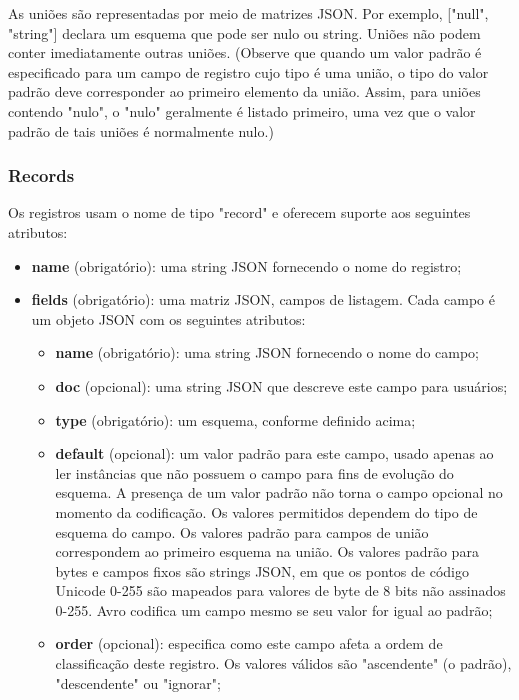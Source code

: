 \documentclass[12pt]{article}
\begin{document}
As uniões são representadas por meio de matrizes JSON. Por exemplo, ["null", "string"] declara um esquema que pode ser nulo ou string. Uniões não podem conter imediatamente outras uniões. (Observe que quando um valor padrão é especificado para um campo de registro cujo tipo é uma união, o tipo do valor padrão deve corresponder ao primeiro elemento da união. Assim, para uniões contendo "nulo", o "nulo" geralmente é listado primeiro, uma vez que o valor padrão de tais uniões é normalmente nulo.)

\subsubsection{Records}
Os registros usam o nome de tipo "record" e oferecem suporte aos seguintes atributos: 

\begin{itemize}
    \item \textbf{name} (obrigatório): uma string JSON fornecendo o nome do registro;
    
    \item \textbf{fields} (obrigatório): uma matriz JSON, campos de listagem. Cada campo é um objeto JSON com os seguintes atributos: 
    \begin{itemize}
        \item \textbf{name} (obrigatório): uma string JSON fornecendo o nome do campo;
        
        \item \textbf{doc} (opcional): uma string JSON que descreve este campo para usuários;
        
        \item \textbf{type} (obrigatório): um esquema, conforme definido acima;
        
        \item \textbf{default} (opcional): um valor padrão para este campo, usado apenas ao ler instâncias que não possuem o campo para fins de evolução do esquema. A presença de um valor padrão não torna o campo opcional no momento da codificação. Os valores permitidos dependem do tipo de esquema do campo. Os valores padrão para campos de união correspondem ao primeiro esquema na união. Os valores padrão para bytes e campos fixos são strings JSON, em que os pontos de código Unicode 0-255 são mapeados para valores de byte de 8 bits não assinados 0-255. Avro codifica um campo mesmo se seu valor for igual ao padrão;
        
        \item \textbf{order} (opcional): especifica como este campo afeta a ordem de classificação deste registro. Os valores válidos são "ascendente" (o padrão), "descendente" ou "ignorar";
        

\end{itemize}
\end{itemize}
\end{document}
